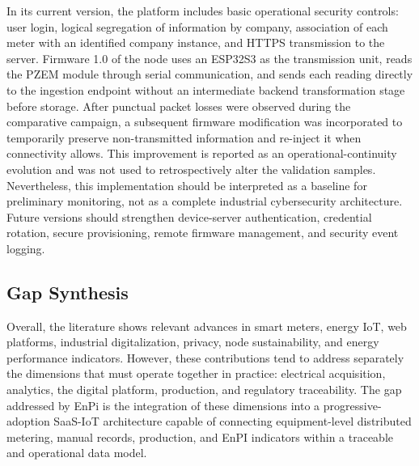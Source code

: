 \documentclass{ieeeaccess}
\begin{document}
In its current version, the platform includes basic operational security controls: user login, logical segregation of information by company, association of each meter with an identified company instance, and HTTPS transmission to the server. Firmware 1.0 of the node uses an ESP32S3 as the transmission unit, reads the PZEM module through serial communication, and sends each reading directly to the ingestion endpoint without an intermediate backend transformation stage before storage. After punctual packet losses were observed during the comparative campaign, a subsequent firmware modification was incorporated to temporarily preserve non-transmitted information and re-inject it when connectivity allows. This improvement is reported as an operational-continuity evolution and was not used to retrospectively alter the validation samples. Nevertheless, this implementation should be interpreted as a baseline for preliminary monitoring, not as a complete industrial cybersecurity architecture. Future versions should strengthen device-server authentication, credential rotation, secure provisioning, remote firmware management, and security event logging.

\subsection{Gap Synthesis}
\label{subsec:gap-synthesis}

Overall, the literature shows relevant advances in smart meters, energy IoT, web platforms, industrial digitalization, privacy, node sustainability, and energy performance indicators. However, these contributions tend to address separately the dimensions that must operate together in practice: electrical acquisition, analytics, the digital platform, production, and regulatory traceability. The gap addressed by EnPi is the integration of these dimensions into a progressive-adoption SaaS-IoT architecture capable of connecting equipment-level distributed metering, manual records, production, and EnPI indicators within a traceable and operational data model.
\end{document}
